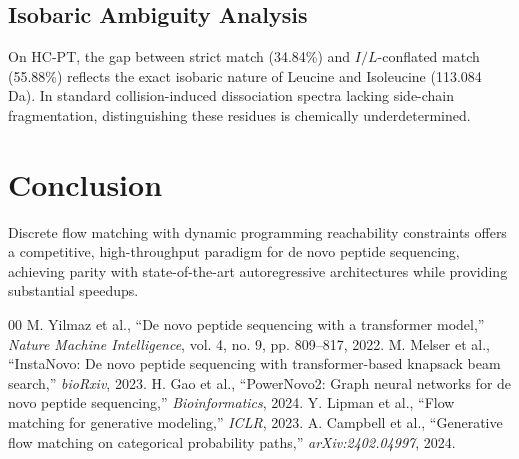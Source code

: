 \documentclass[10pt,journal,compsoc]{IEEEtran}
\begin{document}
\subsection{Isobaric Ambiguity Analysis}
On HC-PT, the gap between strict match (34.84\%) and $I/L$-conflated match (55.88\%) reflects the exact isobaric nature of Leucine and Isoleucine (113.084 Da). In standard collision-induced dissociation spectra lacking side-chain fragmentation, distinguishing these residues is chemically underdetermined.

\section{Conclusion}
Discrete flow matching with dynamic programming reachability constraints offers a competitive, high-throughput paradigm for de novo peptide sequencing, achieving parity with state-of-the-art autoregressive architectures while providing substantial speedups.

\begin{thebibliography}{00}
 M. Yilmaz et al., ``De novo peptide sequencing with a transformer model,'' \emph{Nature Machine Intelligence}, vol. 4, no. 9, pp. 809--817, 2022.
 M. Melser et al., ``InstaNovo: De novo peptide sequencing with transformer-based knapsack beam search,'' \emph{bioRxiv}, 2023.
 H. Gao et al., ``PowerNovo2: Graph neural networks for de novo peptide sequencing,'' \emph{Bioinformatics}, 2024.
 Y. Lipman et al., ``Flow matching for generative modeling,'' \emph{ICLR}, 2023.
 A. Campbell et al., ``Generative flow matching on categorical probability paths,'' \emph{arXiv:2402.04997}, 2024.
\end{thebibliography}
\end{document}
